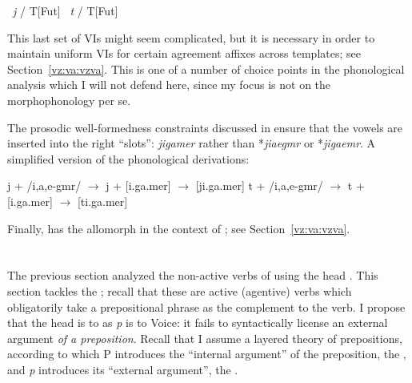 \begin{exe}
\begin{xlist}
\begin{xlist}
\begin{exe}
\begin{xlist}
\begin{xlist}
\begin{exe}
\begin{xlist}
\begin{xlist}
\begin{exe}
\begin{exe}
\begin{xlist}
\begin{exe}
\begin{exe}
\begin{xlist}
\begin{exe}
\begin{exe}
\begin{exe}
\begin{exe}
\begin{exe}
\begin{xlist}
\begin{exe}
\begin{xlist}
\begin{exe}
\begin{exe}
\begin{xlist}
\begin{exe}
\begin{xlist}
\begin{exe}
\begin{xlist}
\begin{exe}
\begin{exe}
\begin{exe}
\begin{xlist}
\begin{exe}
\begin{exe}
\begin{exe}
\begin{xlist}
\begin{exe}
\begin{xlist}
\begin{exe}
\begin{exe}
\begin{xlist}
\begin{exe}
\begin{exe}
\begin{exe}
\begin{exe}
 \ex  
 \begin{xlist} 
 	 \lra~\emph{j} / {\trace} T[Fut] 
 	 \lra~\emph{t} / {\trace} T[Fut] 
 \z
\z

This last set of VIs might seem complicated, but it is necessary in order to maintain uniform VIs for certain agreement affixes across templates; see Section~\ref{vz:va:vzva}. This is one of a number of choice points in the phonological analysis which I will not defend here, since my focus is not on the morphophonology per se.\largerpage[2]

The prosodic well-formedness constraints discussed in \cite{kastner18nllt} ensure that the vowels are inserted into the right ``slots'': \emph{jigamer} rather than *\emph{jiaegmr} or *\emph{jigaemr}. A simplified version of the phonological derivations:

 \begin{exe}
 \ex  
 \begin{xlist} 
 	\ex  j + /i,a,e-gmr/ $\rightarrow$ j + [i.ga.mer] $\rightarrow$ [ji.ga.mer] 
 	\ex  t + /i,a,e-gmr/ $\rightarrow$ t + [i.ga.mer] $\rightarrow$ [ti.ga.mer] 
 \z
\z 

Finally, {\vz} has the allomorph {\thit} in the context of {\va}; see Section~\ref{vz:va:vzva}.


\section{\pz} \label{vz:pz}
The previous section analyzed the non-active verbs of {\tnif} using the head {\vz}. This section tackles the ; recall that these are active (agentive) verbs which obligatorily take a prepositional phrase as the complement to the verb. I propose that the head {\pz} is to {\vz} as \textit{p} is to Voice: it fails to syntactically license an external argument \emph{of a preposition}. Recall that I assume a layered theory of prepositions, according to which P introduces the ``internal argument'' of the preposition, the , and \textit{p} introduces its ``external argument'', the .


\end{xlist}
\end{exe}
\end{xlist}
\end{exe}
\end{exe}
\end{exe}
\end{exe}
\end{xlist}
\end{exe}
\end{exe}
\end{xlist}
\end{exe}
\end{xlist}
\end{exe}
\end{exe}
\end{exe}
\end{xlist}
\end{exe}
\end{exe}
\end{exe}
\end{xlist}
\end{exe}
\end{xlist}
\end{exe}
\end{xlist}
\end{exe}
\end{exe}
\end{xlist}
\end{exe}
\end{xlist}
\end{exe}
\end{exe}
\end{exe}
\end{exe}
\end{exe}
\end{xlist}
\end{exe}
\end{exe}
\end{xlist}
\end{exe}
\end{exe}
\end{xlist}
\end{xlist}
\end{exe}
\end{xlist}
\end{xlist}
\end{exe}
\end{xlist}
\end{xlist}
\end{exe}
